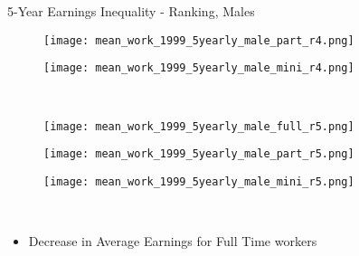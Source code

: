 \documentclass[hyperref={bookmarks=false}]{beamer}
\begin{document}
\begin{appendix}
\begin{frame}{5-Year Earnings Inequality - Ranking, Males}
\begin{figure}[!t]
\begin{minipage}[b]{0.15\textwidth}{}
\centering
\texttt{[image: mean\_work\_1999\_5yearly\_male\_part\_r4.png]}
\end{minipage}
\begin{minipage}[b]{0.15\textwidth}{}
\centering
\texttt{[image: mean\_work\_1999\_5yearly\_male\_mini\_r4.png]}
\end{minipage}\\
\begin{minipage}[b]{0.15\textwidth}{}
\centering
\texttt{[image: mean\_work\_1999\_5yearly\_male\_full\_r5.png]}
\end{minipage}
\begin{minipage}[b]{0.15\textwidth}{}
\centering
\texttt{[image: mean\_work\_1999\_5yearly\_male\_part\_r5.png]}
\end{minipage}
\begin{minipage}[b]{0.15\textwidth}{}
\centering
\texttt{[image: mean\_work\_1999\_5yearly\_male\_mini\_r5.png]}
\end{minipage}\\
\end{figure}
\begin{itemize}
\item Decrease in Average Earnings for Full Time workers
\end{itemize}
\end{frame}


\end{appendix}
\end{document}

